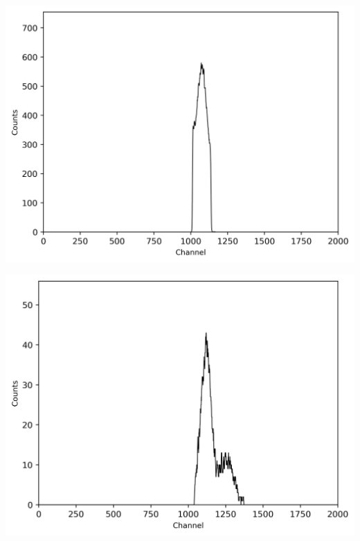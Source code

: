 \begin{center}
    \begin{adjustbox}{max width=\linewidth, keepaspectratio}
        \includegraphics[]{png/60CoEnergiewindow2-peak2}
    \end{adjustbox}
    \label{fig:}
\end{center}
%
\begin{center}
    \begin{adjustbox}{max width=\linewidth, keepaspectratio}
        \includegraphics[]{png/60CoKaskadenEnergiewindowBeiPeak2}
    \end{adjustbox}
    \label{fig:}
\end{center}
